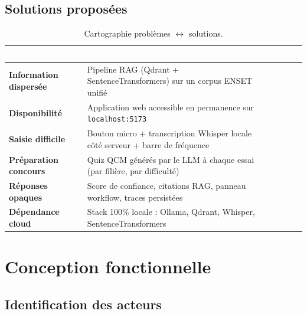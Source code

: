 \documentclass[11pt, a4paper]{article}
\newcommand{\greencheck}{%
  \begin{tikzpicture}[baseline=-0.3em]
    \draw[macgreen, line width=1.5pt, line cap=round, line join=round] (0,0.15) -- (0.15,0) -- (0.4,0.4);
  \end{tikzpicture}%
}
\begin{document}
\subsection{Solutions proposées}

\begin{table}[H]
    \centering
    \sffamily
    \renewcommand{\arraystretch}{1.4}
    \begin{tabularx}{\textwidth}{>{\bfseries}p{3.8cm} X c}
        \toprule
        \rowcolor{mypurple}
        \textcolor{white}{Problème} & \textcolor{white}{Solution retenue} & \textcolor{white}{Statut} \\
        \midrule
        Information dispersée & Pipeline RAG (Qdrant + SentenceTransformers) sur un corpus ENSET unifié & \greencheck \\
        \rowcolor{codegray}
        Disponibilité & Application web accessible en permanence sur \texttt{localhost:5173} & \greencheck \\
        Saisie difficile & Bouton micro + transcription Whisper locale côté serveur + barre de fréquence & \greencheck \\
        \rowcolor{codegray}
        Préparation concours & Quiz QCM générés par le LLM à chaque essai (par filière, par difficulté) & \greencheck \\
        Réponses opaques & Score de confiance, citations RAG, panneau workflow, traces persistées & \greencheck \\
        \rowcolor{codegray}
        Dépendance cloud & Stack 100\% locale : Ollama, Qdrant, Whisper, SentenceTransformers & \greencheck \\
        \bottomrule
    \end{tabularx}
    \caption{Cartographie problèmes $\leftrightarrow$ solutions.}
\end{table}

\section{Conception fonctionnelle}

\subsection{Identification des acteurs}
\end{document}
